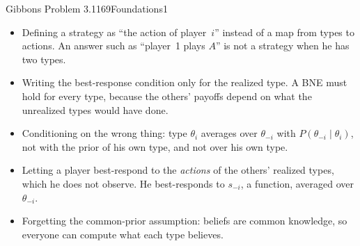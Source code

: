 \begin{exsol}{Gibbons Problem 3.1}{169}{Foundations}{1}
\mistakes
\begin{itemize}
  \item Defining a strategy as ``the action of player~$i$'' instead of a map from types to actions.
  An answer such as ``player~1 plays $A$'' is not a strategy when he has two types.
  \item Writing the best-response condition only for the realized type. A BNE must hold for
  every type, because the others' payoffs depend on what the unrealized types would have done.
  \item Conditioning on the wrong thing: type $\theta_i$ averages over $\theta_{-i}$ with
  $P(\theta_{-i}\mid\theta_i)$, not with the prior of his own type, and not over his own type.
  \item Letting a player best-respond to the \emph{actions} of the others' realized types, which he
  does not observe. He best-responds to $s_{-i}$, a function, averaged over $\theta_{-i}$.
  \item Forgetting the common-prior assumption: beliefs are common knowledge, so everyone can
  compute what each type believes.
\end{itemize}

\end{exsol}
